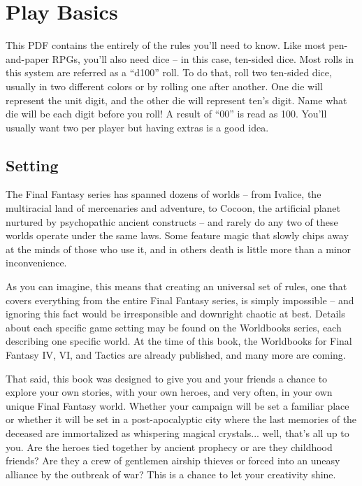 \label{ch:introduction}
\section{Play Basics}
\label{sec:basics}
\begin{multicols}{2}
This PDF contains the entirely of the rules
you'll need to know. Like most pen-and-paper
RPGs, you'll also need dice – in this case, ten-sided
dice. Most rolls in this system are referred as a
“d100” roll. To do that, roll two ten-sided dice,
usually in two different colors or by rolling one
after another. One die will represent the unit digit,
and the other die will represent ten's digit. Name
what die will be each digit before you roll! A result
of “00” is read as 100. You’ll usually want two per
player but having extras is a good idea.

\subsection{Setting}
\label{subsec:setting}
The Final Fantasy series has spanned
dozens of worlds – from Ivalice, the multiracial
land of mercenaries and adventure, to Cocoon, the
artificial planet nurtured by psychopathic ancient
constructs – and rarely do any two of these worlds
operate under the same laws. Some feature magic
that slowly chips away at the minds of those who
use it, and in others death is little more than a
minor inconvenience.

As you can imagine, this means that creating
an universal set of rules, one that covers
everything from the entire Final Fantasy series, is
simply impossible – and ignoring this fact would
be irresponsible and downright chaotic at best.
Details about each specific game setting may be
found on the Worldbooks series, each describing
one specific world. At the time of this book, the
Worldbooks for Final Fantasy IV, VI, and Tactics are
already published, and many more are coming.

That said, this book was designed to give you
and your friends a chance to explore your own
stories, with your own heroes, and very often, in
your own unique Final Fantasy world. Whether
your campaign will be set a familiar place or
whether it will be set in a post-apocalyptic city
where the last memories of the deceased are
immortalized as whispering magical crystals...
well, that’s all up to you. Are the heroes tied
together by ancient prophecy or are they
childhood friends? Are they a crew of gentlemen
airship thieves or forced into an uneasy alliance by
the outbreak of war? This is a chance to let your
creativity shine.


\end{multicols}
